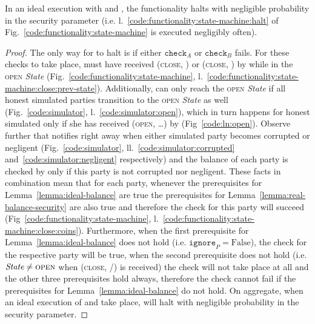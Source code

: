 \begin{lemma}[No halt]
\label{lemma:no-halt}
  In an ideal execution with \fchan and \simulator, the functionality halts with
  negligible probability in the security parameter (i.e.
  l.~\ref{code:functionality:state-machine:halt} of
  Fig.~\ref{code:functionality:state-machine} is executed negligibly often).
\end{lemma}

\begin{proof}
  The only way for \fchan to halt is if either $\texttt{check}_A$ or
  $\texttt{check}_B$ fails. For these checks to take place, \fchan must have
  received (\textsc{close}, \alice) or (\textsc{close}, \bob) by \simulator
  while in the \textsc{open} \textit{State}
  (Fig.~\ref{code:functionality:state-machine},
  l.~\ref{code:functionality:state-machine:close:prev-state}). Additionally,
  \fchan can only reach the \textsc{open} \textit{State} if all honest simulated
  parties transition to the \textsc{open} \textit{State} as well
  (Fig.~\ref{code:simulator}, l.~\ref{code:simulator:open}), which in turn
  happens for honest simulated \alice only if she has received (\textsc{open},
  \dots) by \environment (Fig~\ref{code:ln:open}). Observe further that
  \simulator notifies \fchan right away when either simulated party becomes
  corrupted or negligent (Fig.~\ref{code:simulator},
  ll.~\ref{code:simulator:corrupted} and~\ref{code:simulator:negligent}
  respectively) and the balance of each party is checked by \fchan only if this
  party is not corrupted nor negligent. These facts in combination mean that for
  each party, whenever the prerequisites for Lemma~\ref{lemma:ideal-balance} are
  true the prerequisites for Lemma~\ref{lemma:real-balance-security} are also
  true and therefore the check for this party will succeed
  (Fig~\ref{code:functionality:state-machine},
  l.~\ref{code:functionality:state-machine:close:coins}). Furthermore, when the
  first prerequisite for Lemma~\ref{lemma:ideal-balance} does not hold (i.e.
  $\texttt{ignore}_P = \mathrm{False}$), the check for the respective party will
  be true, when the second prerequisite does not hold (i.e. $\textit{State} \neq
  \textsc{open}$ when (\textsc{close}, \alice/\bob) is received) the check will
  not take place at all and the other three prerequisites hold always, therefore
  the check cannot fail if the prerequisites for Lemma~\ref{lemma:ideal-balance}
  do not hold. On aggregate, when an ideal execution of \fchan and \simulator
  take place, \fchan will halt with negligible probability in the security
  parameter.
\end{proof}
